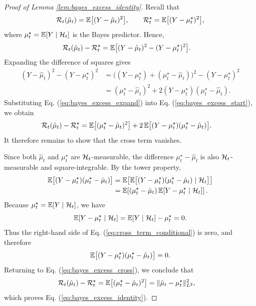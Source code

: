 \begin{proof}[Proof of Lemma \ref{lem:bayes_excess_identity}]
Recall that
\[
\mathcal R_t(\hat\mu_t)=\mathbb{E}\bigl[(Y-\hat\mu_t)^2\bigr],
\qquad
\mathcal R_t^\star=\mathbb{E}\bigl[(Y-\mu_t^\star)^2\bigr],
\]
where $\mu_t^\star=\mathbb{E}[Y\mid \mathcal{H}_t]$ is the Bayes predictor. Hence,
\begin{align}
\mathcal R_t(\hat\mu_t)-\mathcal R_t^\star
&=
\mathbb{E}\bigl[(Y-\hat\mu_t)^2-(Y-\mu_t^\star)^2\bigr].
\label{eq:bayes_excess_start}
\end{align}
Expanding the difference of squares gives
\begin{align}
(Y-\hat\mu_t)^2-(Y-\mu_t^\star)^2
&=
\bigl((Y-\mu_t^\star)+(\mu_t^\star-\hat\mu_t)\bigr)^2-(Y-\mu_t^\star)^2
\nonumber\\
&=
(\mu_t^\star-\hat\mu_t)^2
+
2(Y-\mu_t^\star)(\mu_t^\star-\hat\mu_t).
\label{eq:bayes_excess_expand}
\end{align}
Substituting Eq. (\ref{eq:bayes_excess_expand}) into Eq. (\ref{eq:bayes_excess_start}), we obtain
\begin{align}
\mathcal R_t(\hat\mu_t)-\mathcal R_t^\star
&=
\mathbb{E}\bigl[(\mu_t^\star-\hat\mu_t)^2\bigr]
+
2\,\mathbb{E}\bigl[(Y-\mu_t^\star)(\mu_t^\star-\hat\mu_t)\bigr].
\label{eq:bayes_excess_cross}
\end{align}
It therefore remains to show that the cross term vanishes.

Since both $\hat\mu_t$ and $\mu_t^\star$ are $\mathcal{H}_t$-measurable, the difference
$\mu_t^\star-\hat\mu_t$ is also $\mathcal{H}_t$-measurable and square-integrable. By the tower property,
\begin{align}
\mathbb{E}\bigl[(Y-\mu_t^\star)(\mu_t^\star-\hat\mu_t)\bigr]
&=
\mathbb{E}\!\left[
\mathbb{E}\bigl[(Y-\mu_t^\star)(\mu_t^\star-\hat\mu_t)\mid \mathcal{H}_t\bigr]
\right]
\nonumber\\
&=
\mathbb{E}\!\left[
(\mu_t^\star-\hat\mu_t)\,\mathbb{E}[Y-\mu_t^\star\mid \mathcal{H}_t]
\right].
\label{eq:cross_term_conditional}
\end{align}
Because $\mu_t^\star=\mathbb{E}[Y\mid \mathcal{H}_t]$, we have
\[
\mathbb{E}[Y-\mu_t^\star\mid \mathcal{H}_t]
=
\mathbb{E}[Y\mid \mathcal{H}_t]-\mu_t^\star
=
0.
\]
Thus the right-hand side of Eq. (\ref{eq:cross_term_conditional}) is zero, and therefore
\[
\mathbb{E}\bigl[(Y-\mu_t^\star)(\mu_t^\star-\hat\mu_t)\bigr]=0.
\]
Returning to Eq. (\ref{eq:bayes_excess_cross}), we conclude that
\begin{align}
\mathcal R_t(\hat\mu_t)-\mathcal R_t^\star
&=
\mathbb{E}\bigl[(\mu_t^\star-\hat\mu_t)^2\bigr]
=
\|\hat\mu_t-\mu_t^\star\|_{L^2}^2,
\end{align}
which proves Eq. (\ref{eq:bayes_excess_identity}).
\end{proof}
